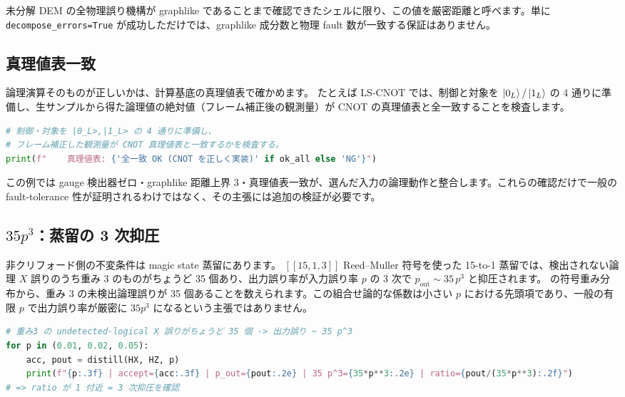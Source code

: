 未分解 DEM の全物理誤り機構が graphlike であることまで確認できたシェルに限り、この値を厳密距離と呼べます。単に \texttt{decompose\_errors=True} が成功しただけでは、graphlike 成分数と物理 fault 数が一致する保証はありません。

\subsection{真理値表一致}

論理演算そのものが正しいかは、計算基底の真理値表で確かめます。
たとえば LS-CNOT では、制御と対象を $\ket{0_L}/\ket{1_L}$ の 4 通りに準備し、生サンプルから得た論理値の絶対値（フレーム補正後の観測量）が CNOT の真理値表と全一致することを検査します。

\begin{lstlisting}[language=Python, caption={CNOT 真理値表の確認（src/ftqc/ls\_cnot\_ft.py の demo() の [C] から要約）}]
# 制御・対象を |0_L>,|1_L> の 4 通りに準備し、
# フレーム補正した観測量が CNOT 真理値表と一致するかを検査する。
print(f"    真理値表: {'全一致 OK (CNOT を正しく実装)' if ok_all else 'NG'}")
\end{lstlisting}

この例では gauge 検出器ゼロ・graphlike 距離上界 $3$・真理値表一致が、選んだ入力の論理動作と整合します。これらの確認だけで一般の fault-tolerance 性が証明されるわけではなく、その主張には追加の検証が必要です。

\subsection{$35p^3$：蒸留の 3 次抑圧}

非クリフォード側の不変条件は magic state 蒸留にあります。
$[[15,1,3]]$ Reed--Muller 符号を使った 15-to-1 蒸留では、検出されない論理 $X$ 誤りのうち重み 3 のものがちょうど 35 個あり、出力誤り率が入力誤り率 $p$ の 3 次で $p_{\mathrm{out}} \sim 35\,p^3$ と抑圧されます。
 の符号重み分布から、重み 3 の未検出論理誤りが 35 個あることを数えられます。この組合せ論的な係数は小さい $p$ における先頭項であり、一般の有限 $p$ で出力誤り率が厳密に $35p^3$ になるという主張ではありません。

\begin{lstlisting}[language=Python, caption={蒸留の 3 次抑圧の確認（src/ftqc/t\_gate.py の demo() から要約）}]
# 重み3 の undetected-logical X 誤りがちょうど 35 個 -> 出力誤り ~ 35 p^3
for p in (0.01, 0.02, 0.05):
    acc, pout = distill(HX, HZ, p)
    print(f"{p:.3f} | accept={acc:.3f} | p_out={pout:.2e} | 35 p^3={35*p**3:.2e} | ratio={pout/(35*p**3):.2f}")
# => ratio が 1 付近 = 3 次抑圧を確認
\end{lstlisting}

